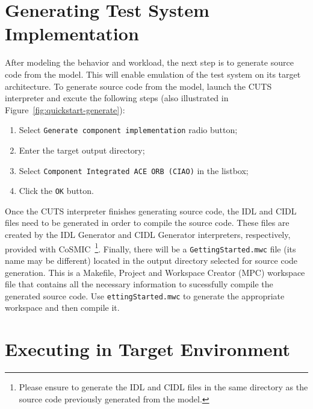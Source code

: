 \section{Generating Test System Implementation}
\label{sec:quickstart-generation}

After modeling the behavior and workload, the next step is to 
generate source code from the model. This will enable emulation 
of the test system on its target architecture. To generate source 
code from the model, launch the CUTS interpreter and excute the 
following steps (also illustrated in Figure~\ref{fig:quickstart-generate}):
\begin{enumerate}
  \item Select \texttt{Generate component implementation} radio button;
  \item Enter the target output directory;
  \item Select \texttt{Component Integrated ACE ORB (CIAO)} in the listbox;
  \item Click the \texttt{OK} button.
\end{enumerate}
Once the CUTS interpreter finishes generating source code, the IDL and CIDL 
files need to be generated in order to compile the source code. These files 
are created by the IDL Generator and CIDL Generator interpreters, respectively, 
provided with CoSMIC~\footnote{Please ensure to generate the IDL and CIDL 
files in the same directory as the source code previously generated 
from the model.}. Finally, there will be a \texttt{GettingStarted.mwc} 
file (its name may be different) located in the output directory selected 
for source code generation. This is a Makefile, Project and Workspace Creator 
(MPC) workspace file that contains all the necessary information to sucessfully 
compile the generated source code. Use \texttt{ettingStarted.mwc} to generate 
the appropriate workspace and then compile it.

\section{Executing in Target Environment}
\label{sec:quickstart-execution}

